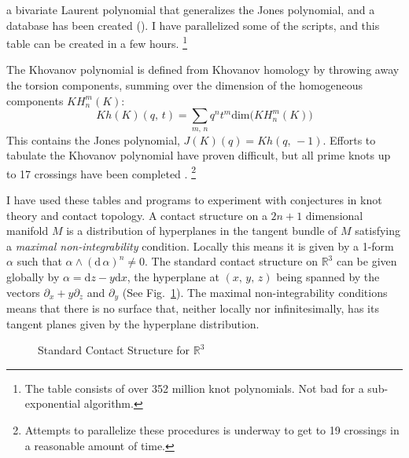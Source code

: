 \documentclass{article}
\theoremstyle{plain}
\begin{document}
        a bivariate Laurent polynomial that generalizes the Jones polynomial,
        and a database has been created (\cite{HOMFLYData}). I have parallelized
        some of the scripts, and this table can be created in a few hours.%
        \footnote{%
            The table consists of over 352 million knot polynomials. Not bad
            for a sub-exponential algorithm.
        }
        \par\hfill\par
        The Khovanov polynomial is defined from Khovanov homology by throwing
        away the torsion components, summing over the dimension of the
        homogeneous components
        $KH_{n}^{m}(K)$:
        \begin{equation}
            Kh(K)(q,\,t)=\sum_{m,\,n}
                q^{n}t^{m}\textrm{dim}\big(KH_{n}^{m}(K)\big)
        \end{equation}
        This contains the Jones polynomial, $J(K)(q)=Kh(q,\,-1)$. Efforts to
        tabulate the Khovanov polynomial have proven difficult, but all prime
        knots up to 17 crossings have been completed \cite{KhovanovData}.%
        \footnote{%
            Attempts to parallelize these procedures is underway to get to
            19 crossings in a reasonable amount of time.
        }
        \par\hfill\par
        I have used these tables and programs to experiment with conjectures in
        knot theory and contact topology. A contact structure on a
        $2n+1$ dimensional manifold $M$ is a distribution of hyperplanes in the
        tangent bundle of $M$ satisfying a \textit{maximal non-integrability}
        condition. Locally this means it is given by a 1-form $\alpha$ such
        that $\alpha\land(\textrm{d}\,\alpha)^{n}\ne{0}$. The standard contact
        structure on $\mathbb{R}^{3}$ can be given globally by
        $\alpha=\textrm{d}z-y\textrm{d}x$, the hyperplane at $(x,\,y,\,z)$
        being spanned by the vectors $\partial_{x}+y\partial_{z}$ and
        $\partial_{y}$ (See Fig.~\ref{fig:darboux_form}). The maximal
        non-integrability conditions means that there is no surface that,
        neither locally nor infinitesimally, has its tangent planes given by
        the hyperplane distribution.
        \begin{figure}
            \centering
            \caption{Standard Contact Structure for $\mathbb{R}^{3}$}
            \label{fig:darboux_form}
        \end{figure}
\end{document}
